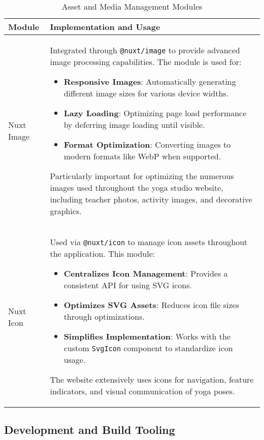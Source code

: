 \begin{table}[H]
    \centering
    \setlength{\tabcolsep}{5pt}
    \renewcommand{\arraystretch}{1.2} 
    \begin{tabular}{|p{3.5cm}|p{10.8cm}|}
        \hline
        \rowcolor{bluepoli!20}
        \textbf{Module} & \textbf{Implementation and Usage} \\
        \hline
        Nuxt Image & 
        Integrated through \texttt{@nuxt/image} to provide advanced image processing capabilities. The module is used for:
        \begin{itemize}
            \item \textbf{Responsive Images}: Automatically generating different image sizes for various device widths.
            \item \textbf{Lazy Loading}: Optimizing page load performance by deferring image loading until visible.
            \item \textbf{Format Optimization}: Converting images to modern formats like WebP when supported.
        \end{itemize}
        Particularly important for optimizing the numerous images used throughout the yoga studio website, including teacher photos, activity images, and decorative graphics.
        \\
        \hline
        Nuxt Icon & 
        Used via \texttt{@nuxt/icon} to manage icon assets throughout the application. This module:
        \begin{itemize}
            \item \textbf{Centralizes Icon Management}: Provides a consistent API for using SVG icons.
            \item \textbf{Optimizes SVG Assets}: Reduces icon file sizes through optimizations.
            \item \textbf{Simplifies Implementation}: Works with the custom \texttt{SvgIcon} component to standardize icon usage.
        \end{itemize}
        The website extensively uses icons for navigation, feature indicators, and visual communication of yoga poses.
        \\
        \hline
    \end{tabular}
    \caption{Asset and Media Management Modules}
\end{table}

\subsection{Development and Build Tooling}

